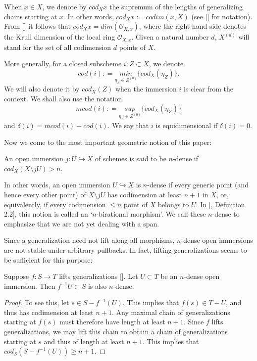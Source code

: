 When $x\in X$, we denote by $cod_Xx$ the supremum of the lengths of generalizing chains starting at $x$. In other words,  $cod_Xx:=codim(\bar{x},X)$ (see [\cite[\href{https://stacks.math.columbia.edu/tag/02I3}{Definition 02I3}]{stacks-project}] for notation). From [\cite[\href{https://stacks.math.columbia.edu/tag/02IZ}{Lemma 02IZ}]{stacks-project}] it follows that $cod_Xx=dim(\mathcal{O}_{X,x})$, where the right-hand side denotes the Krull dimension of the local ring $\mathcal{O}_{X,x}$. Given a natural number $d$, $X^{(d)}$ will stand for the set of all codimension $d$ points of $X$.


More generally, for a closed subscheme $i:Z\subset X$, we denote $$cod{(i)}: =\underset{\eta_Z\in Z^{(0)}}{min} \{cod_X(\eta_Z)\}.$$ We will also denote it by $cod_X(Z)$ when the immersion $i$ is clear from the context. We shall also use the notation $$mcod{(i)}: =\underset{\eta_Z\in Z^{(0)}}{sup} \{cod_X(\eta_Z)\}$$ and $\delta (i)=mcod(i)-cod(i)$. We say that $i$ is equidimensional if $\delta(i)=0$. 


Now we come to the most important geometric notion of this paper:

\begin{defn}
An open immersion $j: U\hookrightarrow X$ of schemes is said to be $n$-dense if $cod_X(X\setminus j U) >n$. 
\end{defn}

In other words, an open immersion $U\hookrightarrow X$ is $n$-dense if every generic point (and hence every other point) of $X\setminus jU$ has codimension at least $n+1$ in $X$, or, equivalently, if every codimension $\leq n$ point of $X$ belongs to $U$. In [\cite{bachmann2019voevodsky}, Definition 2.2], this notion is called an `$n$-birational morphism'. We call these $n$-dense to emphasize that we are not yet dealing with a span.

Since a generalization need not lift along all morphisms, $n$-dense open immersions are not stable under arbitrary pullbacks. In fact, lifting generalizations seems to be sufficient for this purpose:
\begin{lem}
    Suppose $f: S\to T$ lifts generalizations [\cite[\href{https://stacks.math.columbia.edu/tag/0063}{Definition 0063}]{stacks-project}]. Let $U\subset T$ be an $n$-dense open immersion. Then $f^{-1}U\subset S$ is also $n$-dense.
\end{lem}

\begin{proof}
To see this, let $s\in S-f^{-1}(U)$. This implies that $f(s)\in T-U$, and thus has codimension at least $n+1$. Any maximal chain of generalizations starting at $f(s)$ must therefore have length at least $n+1$. Since $f$ lifts generalizations, we may lift this chain to obtain a chain of generalizations starting at $s$ and thus of length at least $n+1$. This implies that $cod_S(S-f^{-1}(U))\geq n+1$. 
\end{proof}

